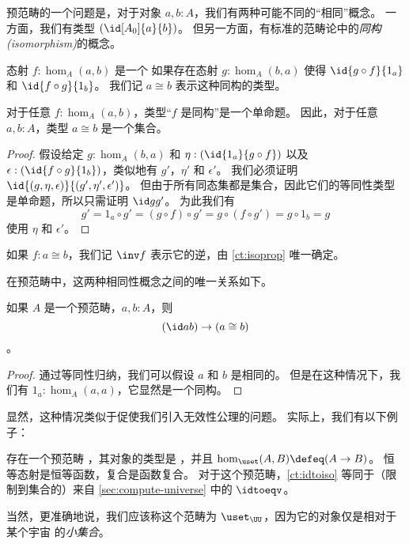 预范畴的一个问题是，对于对象 $a,b:A$，我们有两种可能不同的“相同”概念。
一方面，我们有类型 $(\id[A_0]{a}{b})$。
但另一方面，有标准的范畴论中的\emph{同构 (isomorphism)}的概念。

\begin{defn}\label{ct:isomorphism}
态射 $f:\hom_A(a,b)$ 是一个%
如果存在态射 $g:\hom_A(b,a)$ 使得 $\id{g\circ f}{1_a}$ 和 $\id{f\circ g}{1_b}$。
我们记 $a\cong b$ 表示这种同构的类型。
\end{defn}

\begin{lem}\label{ct:isoprop}
对于任意 $f:\hom_A(a,b)$，类型“$f$ 是同构”是一个单命题。
因此，对于任意 $a,b:A$，类型 $a\cong b$ 是一个集合。
\end{lem}
\begin{proof}
  假设给定 $g:\hom_A(b,a)$ 和 $\eta:(\id{1_a}{g\circ f})$ 以及 $\epsilon:(\id{f\circ g}{1_b})$，类似地有 $g'$，$\eta'$ 和 $\epsilon'$。
  我们必须证明 $\id{(g,\eta,\epsilon)}{(g',\eta',\epsilon')}$。
  但由于所有同态集都是集合，因此它们的等同性类型是单命题，所以只需证明 $\id g {g'}$。
  为此我们有
  \[g' = 1_a\circ g' = (g\circ f)\circ g' = g\circ (f\circ g') = g\circ 1_b = g\]
  使用 $\eta$ 和 $\epsilon'$。
\end{proof}

%
如果 $f:a\cong b$，我们记 $\inv f$ 表示它的逆，由 \cref{ct:isoprop} 唯一确定。

在预范畴中，这两种相同性概念之间的唯一关系如下。

\begin{lem}\label{ct:idtoiso}
如果 $A$ 是一个预范畴，$a,b:A$，则
\[(\id a b)\to (a \cong b)\]。
\end{lem}
\begin{proof}
  通过等同性归纳，我们可以假设 $a$ 和 $b$ 是相同的。
  但是在这种情况下，我们有 $1_a:\hom_A(a,a)$，它显然是一个同构。
\end{proof}

显然，这种情况类似于促使我们引入无效性公理的问题。
实际上，我们有以下例子：

\begin{eg}\label{ct:precatset}
%
存在一个预范畴 \uset，其对象的类型是 \set，并且 $\hom_{\uset}(A,B) \defeq (A\to B)$。
恒等态射是恒等函数，复合是函数复合。
对于这个预范畴，\cref{ct:idtoiso} 等同于（限制到集合的）来自 \cref{sec:compute-universe} 中的 $\idtoeqv$。

当然，更准确地说，我们应该称这个范畴为 $\uset_\UU$，因为它的对象仅是相对于某个宇宙 \UU 的\emph{小集合}。%
\end{eg}

